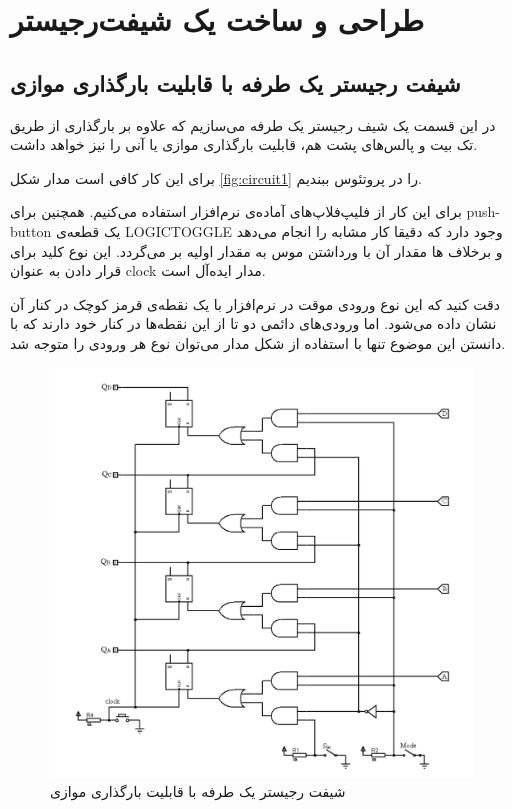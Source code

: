 \chapter{طراحی و ساخت یک شیفت‌رجیستر}
\section{
شیفت رجیستر یک طرفه با قابلیت بارگذاری موازی
}
در این قسمت یک شیف رجیستر یک طرفه می‌سازیم که علاوه بر بارگذاری از طریق تک بیت و پالس‌های پشت هم، قابلیت بارگذاری موازی یا آنی را نیز خواهد داشت.

برای این کار کافی است مدار شکل
\eqref{fig:circuit1}
را در پروتئوس ببندیم.

برای این کار از فلیپ‌فلاپ‌های آماده‌ی نرم‌افزار استفاده می‌کنیم.
همچنین برای
push-button
یک قطعه‌ی
LOGICTOGGLE
وجود دارد که دقیقا کار مشابه را انجام می‌دهد و برخلاف
ها
مقدار آن با ورداشتن موس به مقدار اولیه بر می‌گردد.
این نوع کلید برای قرار دادن به عنوان
clock
مدار ایده‌آل است.

دقت کنید که این نوع ورودی موقت در نرم‌افزار با یک نقطه‌ی قرمز کوچک در کنار آن نشان داده ‌می‌شود.
اما ورودی‌های دائمی دو تا از این نقطه‌ها در کنار خود دارند که با دانستن این موضوع تنها با استفاده از شکل مدار می‌توان نوع هر ورودی را متوجه شد. 

\begin{figure}
    \centering
    \includegraphics[width=\textwidth]{part1/circuit.png}
    \caption{
    شیفت رجیستر یک طرفه با قابلیت بارگذاری موازی
    }
    \label{fig:circuit1}
\end{figure}

